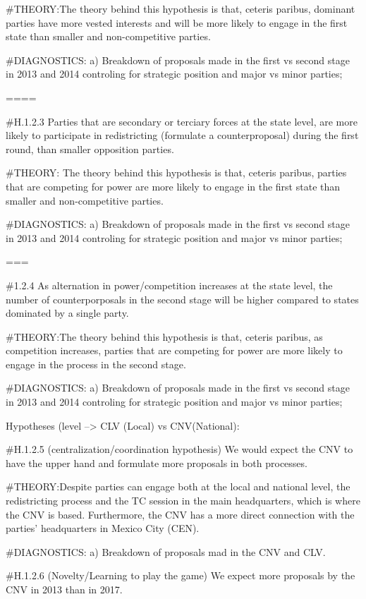 \documentclass[]{article}
\begin{document}
\#THEORY:The theory behind this hypothesis is that, ceteris paribus,
dominant parties have more vested interests and will be more likely to
engage in the first state than smaller and non-competitive parties.

\#DIAGNOSTICS: a) Breakdown of proposals made in the first vs second
stage in 2013 and 2014 controling for strategic position and major vs
minor parties;

====

\#H.1.2.3 Parties that are secondary or terciary forces at the state
level, are more likely to participate in redistricting (formulate a
counterproposal) during the first round, than smaller opposition
parties.

\#THEORY: The theory behind this hypothesis is that, ceteris paribus,
parties that are competing for power are more likely to engage in the
first state than smaller and non-competitive parties.

\#DIAGNOSTICS: a) Breakdown of proposals made in the first vs second
stage in 2013 and 2014 controling for strategic position and major vs
minor parties;

===

\#1.2.4 As alternation in power/competition increases at the state
level, the number of counterporposals in the second stage will be higher
compared to states dominated by a single party.

\#THEORY:The theory behind this hypothesis is that, ceteris paribus, as
competition increases, parties that are competing for power are more
likely to engage in the process in the second stage.

\#DIAGNOSTICS: a) Breakdown of proposals made in the first vs second
stage in 2013 and 2014 controling for strategic position and major vs
minor parties;

Hypotheses (level --\textgreater{} CLV (Local) vs CNV(National):

\#H.1.2.5 (centralization/coordination hypothesis) We would expect the
CNV to have the upper hand and formulate more proposals in both
processes.

\#THEORY:Despite parties can engage both at the local and national
level, the redistricting process and the TC session in the main
headquarters, which is where the CNV is based. Furthermore, the CNV has
a more direct connection with the parties' headquarters in Mexico City
(CEN).

\#DIAGNOSTICS: a) Breakdown of proposals mad in the CNV and CLV.

\#H.1.2.6 (Novelty/Learning to play the game) We expect more proposals
by the CNV in 2013 than in 2017.
\end{document}
